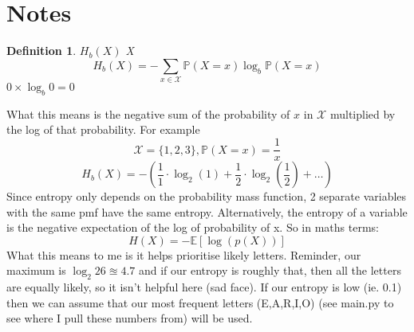\documentclass{article}
\newtheorem{definition}{Definition}
\begin{document}
\section{Notes}
\begin{definition}
      $H_b (X)$  X 
\[H_b (X) = -\sum_{x\in\mathcal{X}} \mathbb{P}(X=x) \log_b \mathbb{P}(X=x)\]
 $0\times \log_b{0}=0$ 
\end{definition}
{What this means is the negative sum of the probability of $x$ in $\mathcal{X}$ multiplied by the log of that probability. For example \[\mathcal{X}=\{1,2,3\}, \mathbb{P}(X=x)=\frac{1}{x}\]\[H_b (X) = - (\frac{1}{1}\cdot\log_2 (1) + \frac{1}{2}\cdot\log_2 (\frac{1}{2}) + \ldots)\]}
{Since entropy only depends on the probability mass function, 2 separate variables with the same pmf have the same entropy. Alternatively, the entropy of a variable is the negative expectation of the log of probability of x. So in maths terms: }
\[H(X)=-\mathbb{E}\left[\log(p(X))\right]\]
{What this means to me is it helps prioritise likely letters. Reminder, our maximum is $\log_2 26\approxeq 4.7$ and if our entropy is roughly that, then all the letters are equally likely, so it isn't helpful here (sad face). If our entropy is low (ie. 0.1) then we can assume that our most frequent letters (E,A,R,I,O) (see main.py to see where I pull these numbers from) will be used.}
\end{document}
